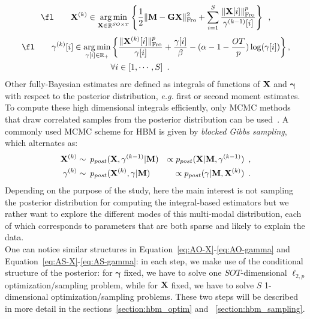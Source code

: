 \begin{equation}\label{eq:AO-X}
\fl \qquad  \bfX^{(k)} \in \argmin_{\bfX\in\R^{SO \times T}} \left\lbrace \frac{1}{2} \fronormsq{\bfM - \bfG \bfX} + \sum_{i=1}^S  \frac{\fronorm{\bfX[i]}^p}{\mathbf{\gamma}^{(k-1)}[i]} \right\rbrace \enspace,
\end{equation}
\begin{equation}\label{eq:AO-gamma}
\begin{split}
\fl \qquad \mathbf{\gamma}^{(k)}[i] \in \argmin_{\mathbf{\gamma}[i]\in \R_+} & \left\lbrace\frac{\fronorm{\bfX^{(k)}[i]}^p }{\mathbf{\gamma}[i]} + \frac{\mathbf{\gamma}[i]}{\beta} - (\alpha - 1 - \frac{OT}{p}) \log(\mathbf{\gamma}[i]) \right\rbrace, \\
& \forall i\in [1,\cdots, S] \enspace. 
\end{split}
\end{equation}
Other fully-Bayesian estimates are defined as integrals of functions of $\mathbf{X}$ and $\mathbf{\gamma}$ with respect to the posterior distribution, \textit{e.g.} first or second moment estimates. To compute these high dimensional integrals efficiently, only \ac{MCMC} methods that draw correlated samples from the posterior distribution can be used~\cite{RoCa05,KaSo05}. A commonly used MCMC scheme for HBM is given by \emph{blocked Gibbs sampling}, which alternates as:
\begin{eqnarray}
\mathbf{X}^{(k)} &\sim \: p_{post}(\mathbf{X},\mathbf{\gamma}^{(k-1)}|\mathbf{M}) &\propto p_{post}(\mathbf{X}|\mathbf{M},\mathbf{\gamma}^{(k-1)}) \enspace, \label{eq:AS-X}\\
\mathbf{\gamma}^{(k)} &\sim \: p_{post}(\mathbf{X}^{(k)},\mathbf{\gamma}|\mathbf{M}) &\propto p_{post}(\mathbf{\gamma}|\mathbf{M},\mathbf{X}^{(k)})\enspace. \label{eq:AS-gamma}
\end{eqnarray}
Depending on the purpose of the study, here the main interest is not sampling the posterior distribution for computing the integral-based estimators but we rather want to explore the different modes of this multi-modal distribution, each of which corresponds to parameters that are both sparse and likely to explain the data.\\
One can notice similar structures in Equation~\eqref{eq:AO-X}-\eqref{eq:AO-gamma} and Equation~\eqref{eq:AS-X}-\eqref{eq:AS-gamma}: in each step, we make use of the conditional structure of the posterior: for $\mathbf{\gamma}$ fixed, we have to solve one $SOT$-dimensional $\ell_{2,p}$ optimization/sampling problem, while for $\mathbf{X}$ fixed, we have to solve $S$ 1-dimensional optimization/sampling problems. These two steps will be described in more detail in the sections~\ref{section:hbm_optim} and~ \ref{section:hbm_sampling}.

